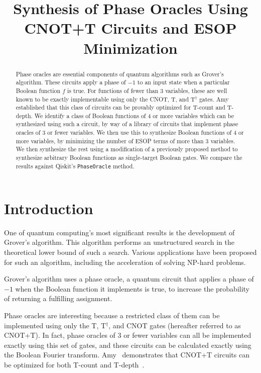 \documentclass[conference]{IEEEtran}
\begin{document}
\title{Synthesis of Phase Oracles Using CNOT+T Circuits and ESOP Minimization}

\author{
}

\maketitle

\begin{abstract}
Phase oracles are essential components of quantum algorithms such as Grover's algorithm. These circuits apply a phase of $-1$ to an input state when a particular Boolean function $f$ is true. For functions of fewer than 3 variables, these are well known to be exactly implementable using only the CNOT, T, and T$^\dagger$ gates. Amy~\cite{amy2018} established that this class of circuits can be provably optimized for T-count and T-depth. We identify a class of Boolean functions of 4 or more variables which can be synthesized using such a circuit, by way of a library of circuits that implement phase oracles of 3 or fewer variables. We then use this to synthesize Boolean functions of 4 or more variables, by minimizing the number of ESOP terms of more than 3 variables. We then synthesize the rest using a modification of a previously proposed method to synthesize arbitrary Boolean functions as single-target Boolean gates. We compare the results against Qiskit's \texttt{PhaseOracle} method.
\end{abstract}

\section{Introduction}
One of quantum computing's most significant results is the development of Grover's algorithm. This algorithm performs an unstructured search in the theoretical lower bound of such a search. Various applications have been proposed for such an algorithm, including the acceleration of solving NP-hard problems.

Grover's algorithm uses a phase oracle, a quantum circuit that applies a phase of $-1$ when the Boolean function it implements is true, to increase the probability of returning a fulfilling assignment.

Phase oracles are interesting because a restricted class of them can be implemented using only the T, T$^\dagger$, and CNOT gates (hereafter referred to as CNOT+T). In fact, phase oracles of 3 or fewer variables can all be implemented exactly using this set of gates, and these circuits can be calculated exactly using the Boolean Fourier transform. Amy~\cite{amy2018} demonstrates that CNOT+T circuits can be optimized for both T-count and T-depth~\cite{amy_matroid}.
\end{document}
